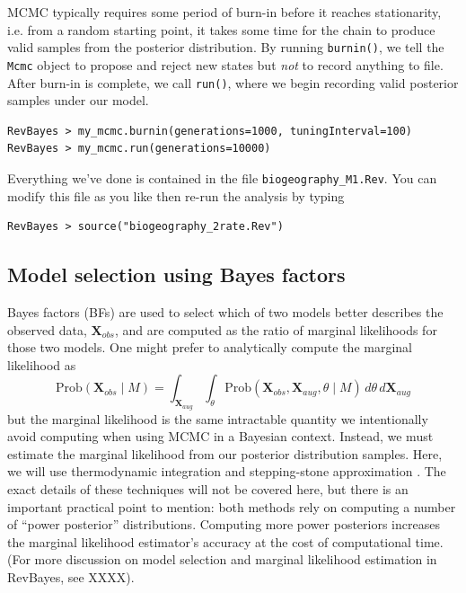 \documentclass[11pt]{article}
\begin{document}
MCMC typically requires some period of burn-in before it reaches stationarity, i.e. from a random starting point, it takes some time for the chain to produce valid samples from the posterior distribution.
By running {\tt burnin()}, we tell the {\tt Mcmc} object to propose and reject new states but {\it not} to record anything to file.
After burn-in is complete, we call {\tt run()}, where we begin recording valid posterior samples under our model.

\begin{snugshade}
\begin{lstlisting}
RevBayes > my_mcmc.burnin(generations=1000, tuningInterval=100)
RevBayes > my_mcmc.run(generations=10000)
\end{lstlisting}
\end{snugshade}

Everything we've done is contained in the file {\tt biogeography\_M1.Rev}.
You can modify this file as you like then re-run the analysis by typing

\begin{snugshade}
\begin{lstlisting}
RevBayes > source("biogeography_2rate.Rev")
\end{lstlisting}
\end{snugshade}

\subsection{Model selection using Bayes factors}

Bayes factors (BFs) are used to select which of two models better describes the observed data, $\mathbf{X}_{obs}$, and are computed as the ratio of marginal likelihoods for those two models.
One might prefer to analytically compute the marginal likelihood as 
\[
\text{Prob}(\mathbf{X}_{obs} \mid M) = \int_{\mathbf{X}_{aug}} \int_{\theta} \text{Prob}(\mathbf{X}_{obs}, \mathbf{X}_{aug}, \theta \mid M) \, d\theta \, d\mathbf{X}_{aug}
\]
but the marginal likelihood is the same intractable quantity we intentionally avoid computing when using MCMC in a Bayesian context.
Instead, we must estimate the marginal likelihood from our posterior distribution samples.
Here, we will use thermodynamic integration \citep{lartillot06} and stepping-stone approximation \citep{xi11}.
The exact details of these techniques will not be covered here, but there is an important practical point to mention: both methods rely on computing a number of ``power posterior'' distributions.
Computing more power posteriors increases the marginal likelihood estimator's accuracy at the cost of computational time.
(For more discussion on model selection and marginal likelihood estimation in RevBayes, see XXXX).
\end{document}
